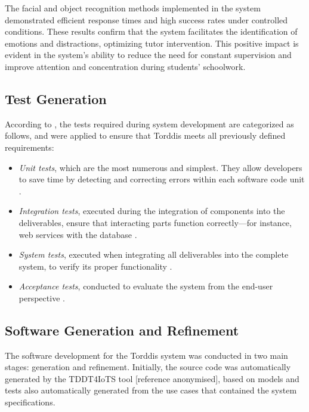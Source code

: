                 The facial and object recognition methods implemented in the system demonstrated efficient response times and high success rates under controlled conditions. These results confirm that the system facilitates the identification of emotions and distractions, optimizing tutor intervention. This positive impact is evident in the system’s ability to reduce the need for constant supervision and improve attention and concentration during students’ schoolwork.
                
                \subsection{Test Generation}
                According to \cite{Sciarra2024Smash}, the tests required during system development are categorized as follows, and were applied to ensure that Torddis meets all previously defined requirements:
                
                \begin{itemize}
                    \item \textit{Unit tests}, which are the most numerous and simplest. They allow developers to save time by detecting and correcting errors within each software code unit \citep{Mafi2024Regression}.
                    
                    \item \textit{Integration tests}, executed during the integration of components into the deliverables, ensure that interacting parts function correctly—for instance, web services with the database \citep{Spath2025Spring}.
                    
                    \item \textit{System tests}, executed when integrating all deliverables into the complete system, to verify its proper functionality \citep{Smytzek2024Tests4Py, Wang2024Ctest4J}.
                    
                    \item \textit{Acceptance tests}, conducted to evaluate the system from the end-user perspective \citep{Augusto2025Software}.
                \end{itemize}
                
                \subsection{Software Generation and Refinement}
                The software development for the Torddis system was conducted in two main stages: generation and refinement. Initially, the source code was automatically generated by the TDDT4IoTS tool [reference anonymised], based on models and tests also automatically generated from the use cases that contained the system specifications.
                
